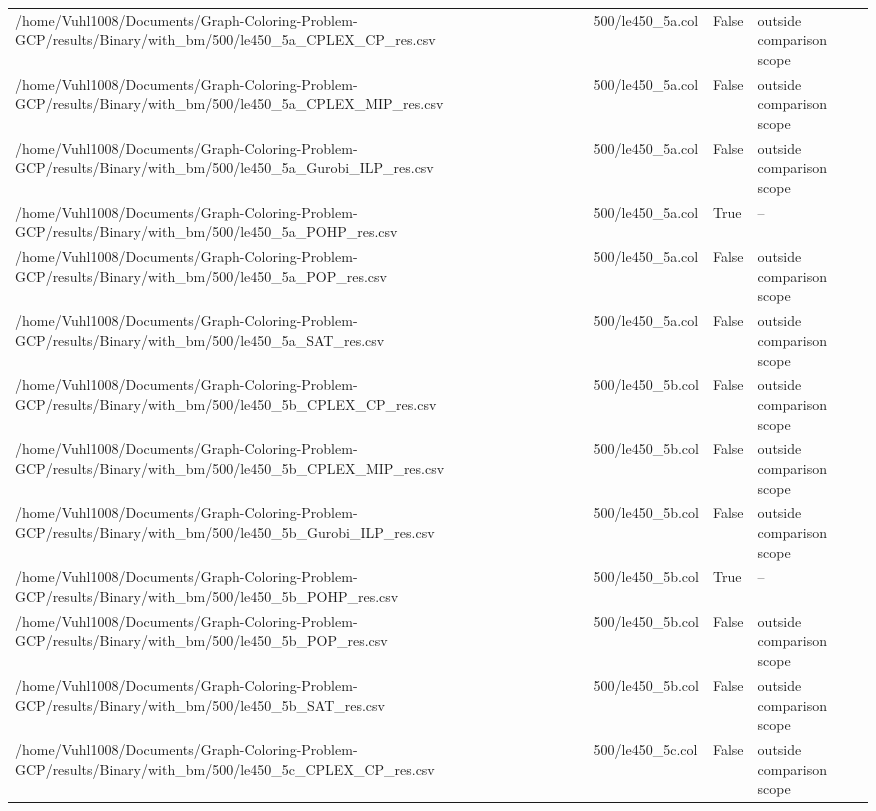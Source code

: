\begin{table}[htbp]
\begin{tabular}{llll}
/home/Vuhl1008/Documents/Graph-Coloring-Problem-GCP/results/Binary/with\_bm/500/le450\_5a\_CPLEX\_CP\_res.csv & 500/le450\_5a.col & False & outside comparison scope \\
/home/Vuhl1008/Documents/Graph-Coloring-Problem-GCP/results/Binary/with\_bm/500/le450\_5a\_CPLEX\_MIP\_res.csv & 500/le450\_5a.col & False & outside comparison scope \\
/home/Vuhl1008/Documents/Graph-Coloring-Problem-GCP/results/Binary/with\_bm/500/le450\_5a\_Gurobi\_ILP\_res.csv & 500/le450\_5a.col & False & outside comparison scope \\
/home/Vuhl1008/Documents/Graph-Coloring-Problem-GCP/results/Binary/with\_bm/500/le450\_5a\_POHP\_res.csv & 500/le450\_5a.col & True & -- \\
/home/Vuhl1008/Documents/Graph-Coloring-Problem-GCP/results/Binary/with\_bm/500/le450\_5a\_POP\_res.csv & 500/le450\_5a.col & False & outside comparison scope \\
/home/Vuhl1008/Documents/Graph-Coloring-Problem-GCP/results/Binary/with\_bm/500/le450\_5a\_SAT\_res.csv & 500/le450\_5a.col & False & outside comparison scope \\
/home/Vuhl1008/Documents/Graph-Coloring-Problem-GCP/results/Binary/with\_bm/500/le450\_5b\_CPLEX\_CP\_res.csv & 500/le450\_5b.col & False & outside comparison scope \\
/home/Vuhl1008/Documents/Graph-Coloring-Problem-GCP/results/Binary/with\_bm/500/le450\_5b\_CPLEX\_MIP\_res.csv & 500/le450\_5b.col & False & outside comparison scope \\
/home/Vuhl1008/Documents/Graph-Coloring-Problem-GCP/results/Binary/with\_bm/500/le450\_5b\_Gurobi\_ILP\_res.csv & 500/le450\_5b.col & False & outside comparison scope \\
/home/Vuhl1008/Documents/Graph-Coloring-Problem-GCP/results/Binary/with\_bm/500/le450\_5b\_POHP\_res.csv & 500/le450\_5b.col & True & -- \\
/home/Vuhl1008/Documents/Graph-Coloring-Problem-GCP/results/Binary/with\_bm/500/le450\_5b\_POP\_res.csv & 500/le450\_5b.col & False & outside comparison scope \\
/home/Vuhl1008/Documents/Graph-Coloring-Problem-GCP/results/Binary/with\_bm/500/le450\_5b\_SAT\_res.csv & 500/le450\_5b.col & False & outside comparison scope \\
/home/Vuhl1008/Documents/Graph-Coloring-Problem-GCP/results/Binary/with\_bm/500/le450\_5c\_CPLEX\_CP\_res.csv & 500/le450\_5c.col & False & outside comparison scope \\

\end{tabular}
\end{table}

